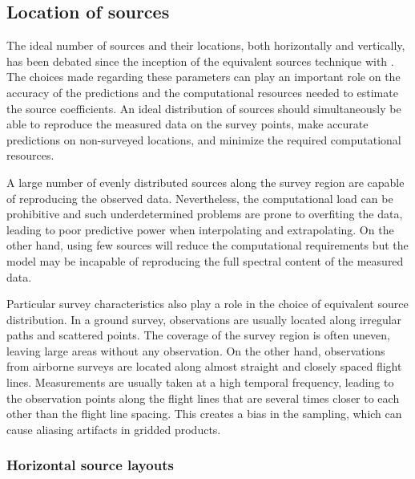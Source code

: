 \documentclass[twocolumn]{article}
\begin{document}
\subsection{Location of sources}
\label{sec:source_distribution}

The ideal number of sources and their locations, both horizontally and
vertically, has been debated since the inception of the equivalent sources
technique with \citet{dampney1969}.
The choices made regarding these parameters can play an important role on the
accuracy of the predictions and the computational resources needed to estimate
the source coefficients.
An ideal distribution of sources should simultaneously be able to reproduce the
measured data on the survey points, make accurate predictions on non-surveyed
locations, and minimize the required computational resources.

A large number of evenly distributed sources along the survey region are
capable of reproducing the observed data.
Nevertheless, the computational load can be prohibitive and such
underdetermined problems are prone to overfiting the data, leading to poor
predictive power when interpolating and extrapolating.
On the other hand, using few sources will reduce the computational requirements
but the model may be incapable of reproducing the full spectral content of the
measured data.

Particular survey characteristics also play a role in the choice of equivalent
source distribution.
In a ground survey, observations are usually located along irregular paths and
scattered points.
The coverage of the survey region is often uneven, leaving large areas without
any observation.
On the other hand, observations from airborne surveys are located along almost
straight and closely spaced flight lines.
Measurements are usually taken at a high temporal frequency, leading to the
observation points along the flight lines that are several times closer to each
other than the flight line spacing.
This creates a bias in the sampling, which can cause aliasing artifacts in
gridded products.

\subsubsection{Horizontal source layouts}
\end{document}
